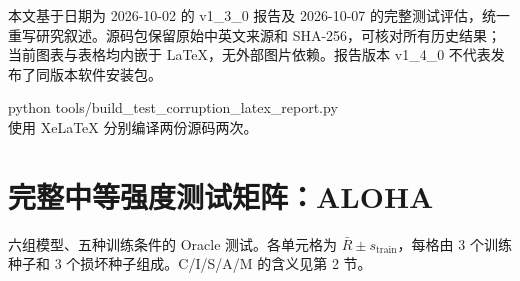 \documentclass[11pt,a4paper,fontset=fandol]{ctexart}
\begin{document}
本文基于日期为 2026-10-02 的 v1\_3\_0 报告及 2026-10-07 的完整测试评估，统一重写研究叙述。源码包保留原始中英文来源和 SHA-256，可核对所有历史结果；当前图表与表格均内嵌于 LaTeX，无外部图片依赖。报告版本 v1\_4\_0 不代表发布了同版本软件安装包。

\begin{tcolorbox}[colback=panel,colframe=rule]\small\ttfamily
python tools/build\_test\_corruption\_latex\_report.py\\
使用 XeLaTeX 分别编译两份源码两次。
\end{tcolorbox}
\endgroup
\appendix
\clearpage\section{完整中等强度测试矩阵：ALOHA}
六组模型、五种训练条件的 Oracle 测试。各单元格为 $\bar R\pm s_{\mathrm{train}}$，每格由 3 个训练种子和 3 个损坏种子组成。C/I/S/A/M 的含义见第 2 节。
\end{document}
